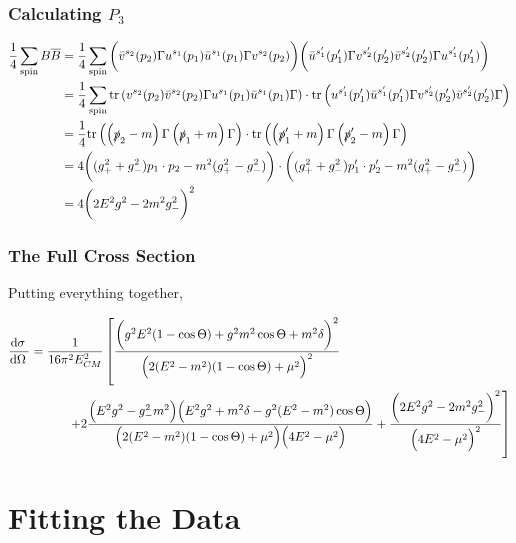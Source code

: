 \documentclass[12pt]{article}
\begin{document}
\subsubsection{Calculating $P_3$}

\begin{align*}
\frac{1}{4} \sum_{\text{spin}} B \overline{B} & = \frac{1}{4} \sum_{\text{spin}} \bigg( \bar{v}^{s_2}(p_2) \Gamma u^{s_1}(p_1) \bar{u}^{s_1}(p_1) \Gamma v^{s_2}(p_2) \bigg) 
\bigg( \bar{u}^{s_1'}(p_1') \Gamma v^{s_2'}(p_2') \bar{v}^{s_2'}(p_2') \Gamma  u^{s_1'}(p_1')  \bigg)
\\
& = \frac{1}{4} \sum_{\text{spin}} \mathrm{tr} \left(  v^{s_2}(p_2) \bar{v}^{s_2}(p_2) \Gamma u^{s_1}(p_1) \bar{u}^{s_1}(p_1) \Gamma  \right) \cdot \mathrm{tr} \left(  u^{s_1'}(p_1') \bar{u}^{s_1'}(p_1') \Gamma v^{s_2'}(p_2') \bar{v}^{s_2'}(p_2') \Gamma    \right)
\\
& = \frac{1}{4} \mathrm{tr} \left(  \left( \slashed{p}_2 - m \right) \Gamma \left( \slashed{p}_1 + m \right) \Gamma  \right) \cdot \mathrm{tr} \left(  \left( \slashed{p}_1' + m \right) \Gamma \left( \slashed{p}'_2 - m \right) \Gamma  \right)
\\
& = 4 \bigg( ( g_{+}^2 + g_{-}^2) p_1 \cdot p_2 - m^2 (g_{+}^2 - g_{-}^2) \bigg) \cdot \bigg( ( g_{+}^2 + g_{-}^2) p_1' \cdot p_2' -  m^2 (g_{+}^2 - g_{-}^2) \bigg)
\\
& = 4 \bigg( 2 E^2 g^2  -2 m^2  g_{-}^2  \bigg)^2
\end{align*}

\subsubsection{The Full Cross Section}

Putting everything together,

\begin{align*}
\frac{\mathrm{d}\sigma \:}{\mathrm{d}\Omega \:} & = \frac{ 1 }{ 16 \pi^2 E_{CM}^2} \left[ \frac{\bigg( g^2 E^2 (1 - \cos{\Theta}) + g^2 m^2 \cos{\Theta} + m^2 \delta \bigg)^2}{\Big( 2 (E^2 - m^2) (1 - \cos{\Theta}) + \mu^2 \Big)^2} 
\right. 
\\ & \left. 
\quad \quad \quad + 2 \frac{\Big( E^2 g^2 - g_{-}^2 m^2 \Big) \Big( E^2 g^2 + m^2 \delta - g^2 (E^2 - m^2) \cos{\Theta} \Big)}{\Big( 2 (E^2 - m^2) (1 - \cos{\Theta}) + \mu^2 \Big) \Big( 4 E^2 - \mu^2 \Big) } + \frac{\bigg( 2 E^2 g^2  -2 m^2  g_{-}^2  \bigg)^2}{ \Big( 4 E^2 - \mu^2 \Big)^2} \right]
\end{align*}

\section{Fitting the Data}
\end{document}
